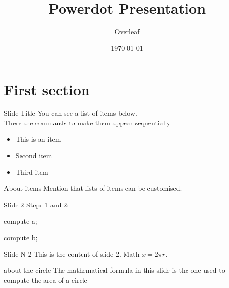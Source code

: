 \documentclass[
    13pt,
    style=klope, %
    display=slidesnotes, %
    paper=smartboard, %
    orient=landscape, %
    ]{powerdot}
\title{Powerdot Presentation}
\author{Overleaf}
\date{\today}
\begin{document}
  \maketitle
  
  \section{First section}
   
\begin{slide}{Slide Title}
You can see a list of items below. \pause \\ %
There are commands to make them appear sequentially
    \begin{itemize}[type=1]
      \item<2> This is an item
      \item<3> Second item
      \item<4> Third item
    \end{itemize}
\end{slide}
\begin{note}{About items}
    Mention that lists of items can be customised.
\end{note}
  
\begin{slide}[method=direct]{Slide 2} 
Steps 1 and 2:
\begin{code}

compute a;

compute b;
\end{code}
\end{slide}
  
\begin{slide}{Slide N 2}
  This is the content of slide 2.
  Math $x=2\pi r$.
\end{slide}
\begin{note}{about the circle}
  The mathematical formula in this slide is the one used to compute the area of a circle
\end{note}
  
\end{document}
